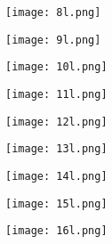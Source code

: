 \begin{figure}[h!]
	\centering
	\texttt{[image: 8l.png]}
	\label{fig:lat_acc_val}
\end{figure}


\begin{figure}[h!]
	\centering
	\texttt{[image: 9l.png]}
	\label{fig:lat_acc_val}
\end{figure}


\begin{figure}[h!]
	\centering
	\texttt{[image: 10l.png]}
	\label{fig:lat_acc_val}
\end{figure}


\begin{figure}[h!]
	\centering
	\texttt{[image: 11l.png]}
	\label{fig:lat_acc_val}
\end{figure}



\begin{figure}[h!]\label{fig:app_conv}
	\centering
	\texttt{[image: 12l.png]}	
	\caption{}
\end{figure}


\begin{figure}[h!]\label{fig:app_grad}
	\centering
	\texttt{[image: 13l.png]}
	\caption{}
	
\end{figure}

\begin{figure}[h!]\label{fig:app_weights}
	\centering
	\texttt{[image: 14l.png]}
	\caption{}
	
\end{figure}


\begin{figure}[h!]\label{fig:app_update}
	\centering
	\texttt{[image: 15l.png]}
	\caption{}
	
\end{figure}


\begin{figure}[h!]\label{fig:app_multigrad}
	\centering
	\texttt{[image: 16l.png]}
	\caption{}

\end{figure}













